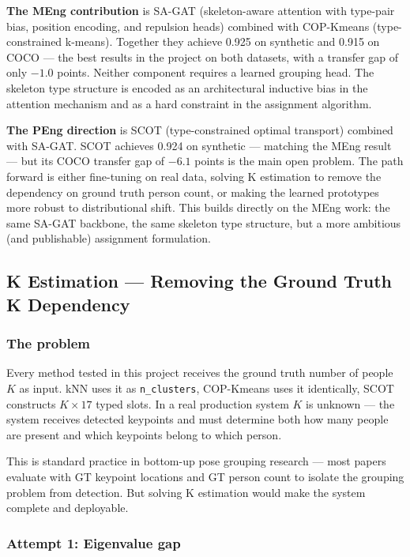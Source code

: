 \textbf{The MEng contribution} is SA-GAT (skeleton-aware attention with type-pair bias, position encoding, and repulsion heads) combined with COP-Kmeans (type-constrained k-means). Together they achieve 0.925 on synthetic and 0.915 on COCO --- the best results in the project on both datasets, with a transfer gap of only $-1.0$ points. Neither component requires a learned grouping head. The skeleton type structure is encoded as an architectural inductive bias in the attention mechanism and as a hard constraint in the assignment algorithm.

\textbf{The PEng direction} is SCOT (type-constrained optimal transport) combined with SA-GAT. SCOT achieves 0.924 on synthetic --- matching the MEng result --- but its COCO transfer gap of $-6.1$ points is the main open problem. The path forward is either fine-tuning on real data, solving K estimation to remove the dependency on ground truth person count, or making the learned prototypes more robust to distributional shift. This builds directly on the MEng work: the same SA-GAT backbone, the same skeleton type structure, but a more ambitious (and publishable) assignment formulation.


\subsection{K Estimation --- Removing the Ground Truth K Dependency}

\subsubsection{The problem}

Every method tested in this project receives the ground truth number of people $K$ as input. kNN uses it as \texttt{n\_clusters}, COP-Kmeans uses it identically, SCOT constructs $K \times 17$ typed slots. In a real production system $K$ is unknown --- the system receives detected keypoints and must determine both how many people are present and which keypoints belong to which person.

This is standard practice in bottom-up pose grouping research --- most papers evaluate with GT keypoint locations and GT person count to isolate the grouping problem from detection. But solving K estimation would make the system complete and deployable.


\subsubsection{Attempt 1: Eigenvalue gap}

